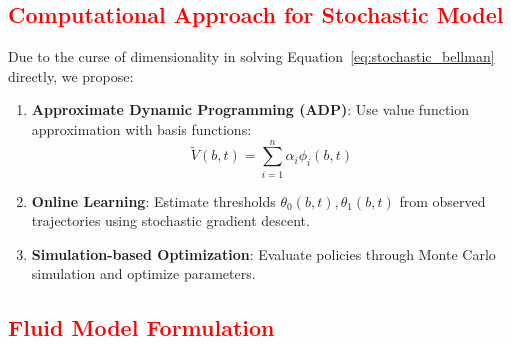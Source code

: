 \documentclass[opre,sglanonrev]{informs4}
\begin{document}
\subsection{\textcolor{red}{Computational Approach for Stochastic Model}}

{\color{brown}
Due to the curse of dimensionality in solving Equation~\eqref{eq:stochastic_bellman} directly, we propose:

\begin{enumerate}
    \item \textbf{Approximate Dynamic Programming (ADP)}: Use value function approximation with basis functions:
    \[
    \tilde{V}(b, t) = \sum_{i=1}^n \alpha_i \phi_i(b, t)
    \]
    
    \item \textbf{Online Learning}: Estimate thresholds \( \theta_0(b, t), \theta_1(b, t) \) from observed trajectories using stochastic gradient descent.
    
    \item \textbf{Simulation-based Optimization}: Evaluate policies through Monte Carlo simulation and optimize parameters.
\end{enumerate}
}

\subsection{\textcolor{red}{Fluid Model Formulation}}
\label{sec:fluid_model}
\end{document}
